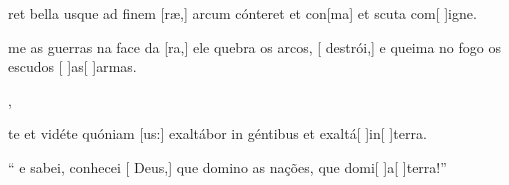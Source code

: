 {  {\item {}ret bella usque ad finem [ræ,] arcum cónteret et con[ma] et scuta com[ ]{i}gne.
    }%
    {\item {}me as guerras na face da [ra,] ele quebra os arcos, [ destrói,] e queima no fogo os escudos [ ]{as}[ ]{ar}mas.},
  {\item {}te et vidéte quóniam [us:] exaltábor in géntibus et exaltá[ ]{in}[ ]{ter}ra.}%
    {\item {}`` e sabei, conhecei [ Deus,] que domino as nações, que domi[ ]{a}[ ]{ter}ra!''}
}